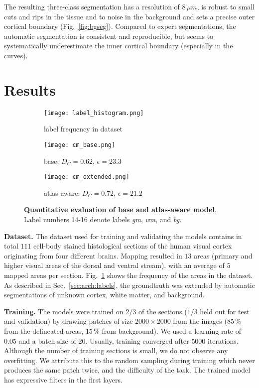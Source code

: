 \documentclass{article}
\begin{document}
The resulting three-class segmentation has a resolution of $8\,\mu m$, is robust to small cuts and rips in the tissue and to noise in the background and sets a precise outer cortical boundary (Fig.~\ref{fig:bgseg}).
Compared to expert segmentations, the automatic segmentation is consistent and reproducible, but seems to systematically underestimate the inner cortical boundary (especially in the curves).

\section{Results}
\label{sec:res}

\begin{figure}[tb]
	\centering
	\begin{subfigure}[t]{.28\columnwidth}
		\centering
		\texttt{[image: label\_histogram.png]}
		\caption{label frequency in dataset}
		\label{fig:hist}
	\end{subfigure}
	\begin{subfigure}[t]{.34\columnwidth}
		\centering
		\texttt{[image: cm\_base.png]}
		\caption{base: $D_C=0.62$, $\epsilon=23.3$}
		\label{}
	\end{subfigure}
	\begin{subfigure}[t]{.36\columnwidth}
		\centering
		\texttt{[image: cm\_extended.png]}
		\caption{atlas-aware: $D_C=0.72$, $\epsilon=21.2$}
		\label{}
	\end{subfigure}
	\caption{
		\textbf{Quantitative evaluation of base and atlas-aware model}.
		Label numbers 14-16 denote labels \emph{gm}, \emph{wm}, and \emph{bg}.
		}
	\label{fig:cm}
\end{figure}




\textbf{Dataset.}
The dataset used for training and validating the models contains in total $111$ cell-body stained histological sections of the human visual cortex originating from four different brains.
Mapping resulted in $13$ areas (primary and higher visual areas of the dorsal and ventral stream), with an average of $5$ mapped areas per section.
Fig.~\ref{fig:hist} shows the frequency of the areas in the dataset.
As described in Sec.~\ref{sec:arch:labels}, the groundtruth was extended by automatic segmentations of unknown cortex, white matter, and background.

\textbf{Training.}
The models were trained on $2/3$ of the sections ($1/3$ held out for test and validation) by drawing patches of size $2000\times2000$ from the images ($85\,\%$ from the delineated areas, $15\,\%$ from background).
We used a learning rate of $0.05$ and a batch size of $20$. Usually, training converged after $5000$ iterations.
Although the number of training sections is small, we do not observe any overfitting. We attribute this to the random sampling during training which never produces the same patch twice, and the difficulty of the task. The trained model has expressive filters in the first layers.
\end{document}
